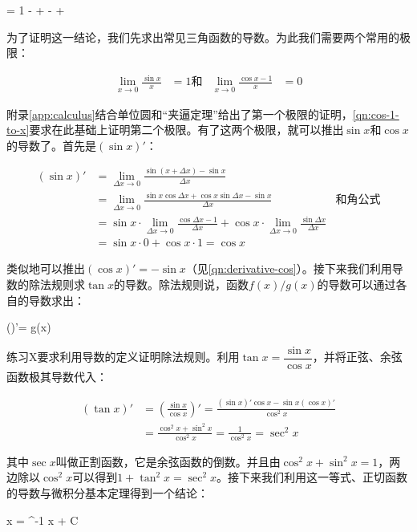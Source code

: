 \documentclass[b5paper]{ctexart}
\begin{document}
\be
{} = 1 -  +  -  + \dotsb
\ee

为了证明这一结论，我们先求出常见三角函数的导数。为此我们需要两个常用的极限：

\begin{align}
\lim_{x \to 0} \frac{\sin x}{x} &= 1  \text{和} & \lim_{x \to 0} \frac{\cos x - 1}{x} &= 0
\end{align}

附录\ref{app:calculus}结合单位圆和“夹逼定理”给出了第一个极限的证明，\cref{qn:cos-1-to-x}要求在此基础上证明第二个极限。有了这两个极限，就可以推出$\sin x$和$\cos x$的导数了。首先是$(\sin x)'$：

\begin{align*}
(\sin x)' &= \lim_{\Delta x \to 0} \frac{\sin(x + \Delta x) - \sin x}{\Delta x} \\
  &= \lim_{\Delta x \to 0} \frac{\sin x \cos \Delta x + \cos x\sin \Delta x - \sin x}{\Delta x} & \text{和角公式} \\
  &= \sin x \cdot \lim_{\Delta x \to 0} \frac{\cos \Delta x - 1}{\Delta x} + \cos x \cdot \lim_{\Delta x \to 0} \frac{\sin \Delta x}{\Delta x} \\
  &= \sin x \cdot 0 + \cos x \cdot 1 = \cos x
\end{align*}

类似地可以推出$(\cos x)' = - \sin x$（见\cref{qn:derivative-cos}）。接下来我们利用导数的除法规则求$\tan x$的导数。除法规则说，函数$f(x)/g(x)$的导数可以通过各自的导数求出：

\be
()'= \qquad {}g(x) 
\ee

练习X要求利用导数的定义证明除法规则。利用$\tan x = \dfrac{\sin x}{\cos x}$，并将正弦、余弦函数极其导数代入：

\begin{align*}
(\tan x)' & = (\frac{\sin x}{\cos x})' = \frac{(\sin x)'\cos x - \sin x (\cos x)'}{\cos^2 x} \\
 &= \frac{\cos^2 x + \sin^2 x}{\cos^2 x} = \frac{1}{\cos^2 x} = \sec^2 x
\end{align*}

其中$\sec x$叫做正割函数，它是余弦函数的倒数。并且由$\cos^2 x + \sin^2 x = 1$，两边除以$\cos^2 x$可以得到$1 + \tan^2 x = \sec^2 x$。接下来我们利用这一等式、正切函数的导数与微积分基本定理得到一个结论：

\be
\int {}  x = \tan^{-1} x + C
\ee
\end{document}
